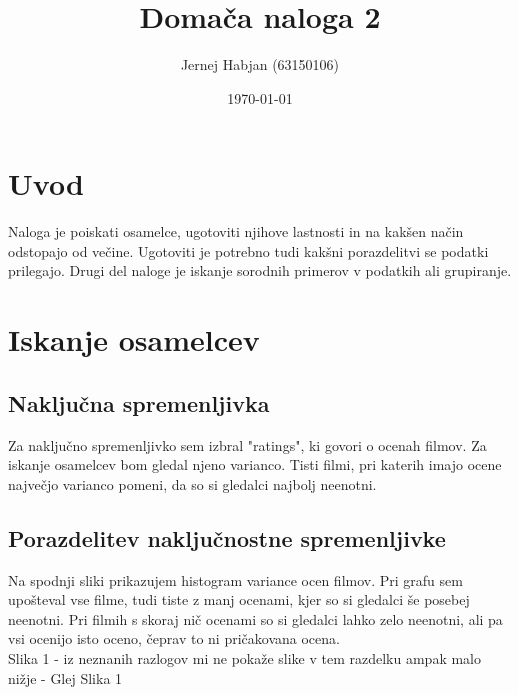 \documentclass[a4paper,11pt]{article}
\title{Domača naloga 2}
\author{Jernej Habjan (63150106)}
\date{\today}
\begin{document}
	
	\maketitle
	\renewcommand\thesubsection{\Alph{subsection}}

	
	\section{Uvod}
	
	Naloga je poiskati osamelce, ugotoviti njihove lastnosti in na kakšen način odstopajo od večine. Ugotoviti je potrebno tudi kakšni porazdelitvi se podatki prilegajo. Drugi del naloge je iskanje sorodnih primerov v podatkih ali grupiranje.
	
	\section{Iskanje osamelcev}

	\subsection{Naključna spremenljivka}
		Za naključno spremenljivko sem izbral "ratings", ki govori o ocenah filmov. Za iskanje osamelcev bom gledal njeno varianco. Tisti filmi, pri katerih imajo ocene največjo varianco pomeni, da so si gledalci najbolj neenotni.

		
	\subsection{Porazdelitev naključnostne spremenljivke}
	
		Na spodnji sliki prikazujem histogram variance ocen filmov. Pri grafu sem upošteval vse filme, tudi tiste z manj ocenami, kjer so si gledalci še posebej neenotni.
		Pri filmih s skoraj nič ocenami so si gledalci lahko zelo neenotni, ali pa vsi ocenijo isto oceno, čeprav to ni pričakovana ocena.\\


		Slika 1 - iz neznanih razlogov mi ne pokaže slike v tem razdelku ampak malo nižje - Glej Slika 1
\end{document}
